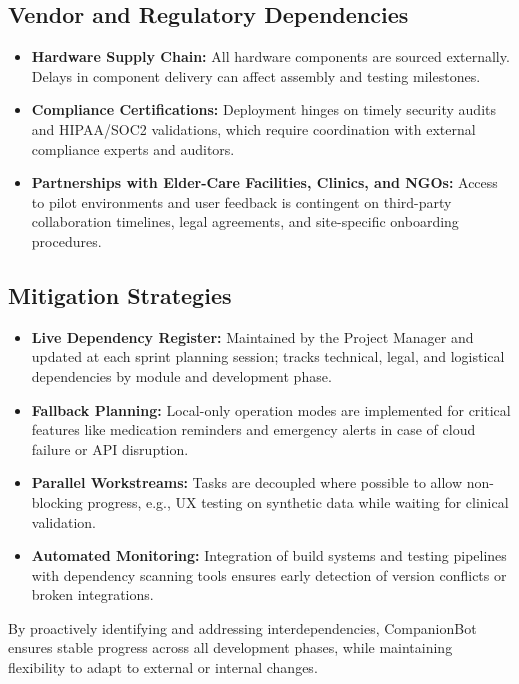 \documentclass[
  letterpaper,
  DIV=11,
  numbers=noendperiod]{scrartcl}
\providecommand{\tightlist}{%
  \setlength{\itemsep}{0pt}\setlength{\parskip}{0pt}}\usepackage{longtable,booktabs,array}
\begin{document}
\subsection{Vendor and Regulatory
Dependencies}\label{vendor-and-regulatory-dependencies}

\begin{itemize}
\tightlist
\item
  \textbf{Hardware Supply Chain:} All hardware components are sourced
  externally. Delays in component delivery can affect assembly and
  testing milestones.
\item
  \textbf{Compliance Certifications:} Deployment hinges on timely
  security audits and HIPAA/SOC2 validations, which require coordination
  with external compliance experts and auditors.
\item
  \textbf{Partnerships with Elder-Care Facilities, Clinics, and NGOs:}
  Access to pilot environments and user feedback is contingent on
  third-party collaboration timelines, legal agreements, and
  site-specific onboarding procedures.
\end{itemize}

\subsection{Mitigation Strategies}\label{mitigation-strategies}

\begin{itemize}
\tightlist
\item
  \textbf{Live Dependency Register:} Maintained by the Project Manager
  and updated at each sprint planning session; tracks technical, legal,
  and logistical dependencies by module and development phase.
\item
  \textbf{Fallback Planning:} Local-only operation modes are implemented
  for critical features like medication reminders and emergency alerts
  in case of cloud failure or API disruption.
\item
  \textbf{Parallel Workstreams:} Tasks are decoupled where possible to
  allow non-blocking progress, e.g., UX testing on synthetic data while
  waiting for clinical validation.
\item
  \textbf{Automated Monitoring:} Integration of build systems and
  testing pipelines with dependency scanning tools ensures early
  detection of version conflicts or broken integrations.
\end{itemize}

By proactively identifying and addressing interdependencies,
CompanionBot ensures stable progress across all development phases,
while maintaining flexibility to adapt to external or internal changes.
\end{document}
